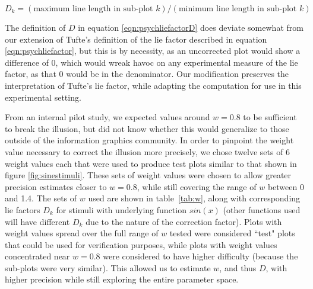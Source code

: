 \documentclass[11pt]{isuthesis}\usepackage[]{graphicx}\usepackage[]{color}
\begin{document}
\begin{equation}\label{eqn:psychliefactorD}
D_k = (\text{maximum line length in sub-plot } k)/(\text{minimum line length in sub-plot } k)
\end{equation}

The definition of $D$ in equation \ref{eqn:psychliefactorD} does deviate somewhat from our extension of Tufte's definition of the lie factor described in equation \ref{eqn:psychliefactor}, but this is by necessity, as an uncorrected plot would show a difference of 0, which would wreak havoc on any experimental measure of the lie factor, as that 0 would be in the denominator. Our modification preserves the interpretation of Tufte's lie factor, while adapting the computation for use in this experimental setting. 

From an internal pilot study, we expected values around $w = 0.8$ to be sufficient to break the illusion, but did not know whether this would generalize to those outside of the information graphics community. In order to pinpoint the weight value necessary to correct the illusion more precisely, we chose twelve sets of 6 weight values each that were used to produce test plots similar to that shown in figure \ref{fig:sinestimuli}. These sets of weight values were chosen to allow greater precision estimates closer to $w=0.8$, while still covering the range of $w$ between 0 and 1.4. The sets of $w$ used are shown in table~\ref{tab:w}, along with corresponding lie factors $D_k$ for stimuli with underlying function $sin(x)$ (other functions used will have different $D_k$ due to the nature of the correction factor). Plots with weight values spread over the full range of $w$ tested were considered ``test" plots that could be used for verification purposes, while plots with weight values concentrated near $w=0.8$ were considered to have higher difficulty (because the sub-plots were very similar). This allowed us to estimate $w$, and thus $D$, with higher precision while still exploring the entire parameter space. 
\end{document}
